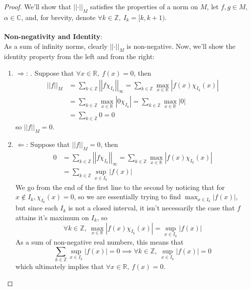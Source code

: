 \documentclass{article}
\newcommand{\be}{\begin{enumerate}}
\newcommand{\ee}{\end{enumerate}}
\newcommand{\norm}[1]{\left|\left|#1\right|\right|}
\newcommand{\abs}[1]{\left|#1\right|}
\newcommand{\R}{\mathbb{R}}
\newcommand{\Z}{\mathbb{Z}}
\newcommand{\C}{\mathbb{C}}
\begin{document}
        \begin{proof}
        We'll show that $\norm{\cdot}_M$ satisfies the properties of a norm 
        on $M$, let $f,g \in M$, $\alpha \in \C$, and, for brevity, denote $\forall k\in \Z,\ 
        I_k = [k,k+1)$.\\\\
        \textbf{Non-negativity and Identity}:\\
        As a sum of infinity norms, clearly $\norm{\cdot}_M$ is non-negative. Now,
        we'll show the identity property from the left and from the right:
        \be
            \item[$\Longrightarrow$:].
            Suppose that $\forall x\in  \R,\ f(x) = 0$, then 
            \begin{align*}
            \norm{f}_M &= \sum_{k\in\Z}\norm{f\chi_{I_k}}_\infty = 
            \sum_{k\in\Z}\max_{x\in \R}\abs{f(x)\chi_{I_k}(x)} \\
            &= \sum_{k\in\Z}\max_{x\in\R}\abs{0\chi_{I_k}} = 
            \sum_{k\in\Z}\max_{x\in\R}\abs{0} \\
            &= \sum_{k\in\Z}0 = 0
            \end{align*}
            so $\norm{f}_M = 0$.

            \item[$\Longleftarrow$:] 
            Suppose that $\norm{f}_M = 0$, then
            \begin{align*}
            0 &= \sum_{k\in\Z}\norm{f\chi_{I_k}}_\infty = \sum_{k\in\Z}
            \max_{x\in\R}\abs{f(x)\chi_{I_k}(x)} \\
            &= \sum_{k\in\Z}\sup_{x\in I_k}\abs{f(x)}
            \end{align*}
            We go from the end of the first line to the second by noticing that for 
            $x \notin I_k, \chi_{I_k}(x) = 0$, so we are essentially trying to find 
            $\max_{x\in I_k}\abs{f(x)}$, but since each $I_k$ is not a closed interval, 
            it isn't necessarily the case that $f$ attains it's maximum on $I_k$, so 
            $$\forall k \in \Z,\ \max_{x\in \R}\abs{f(x)\chi_{I_k}(x)} = 
            \sup_{x\in I_k}\abs{f(x)}$$
            As a sum of non-negative real numbers, this means that
            $$\sum_{k\in\Z}\sup_{x\in I_k}\abs{f(x)} = 0 \implies 
            \forall k \in \Z,\ \sup_{x\in I_k}\abs{f(x)} = 0$$
            which ultimately implies that $\forall x\in\R,\ f(x) = 0$.
        \ee


\end{proof}
\end{document}
